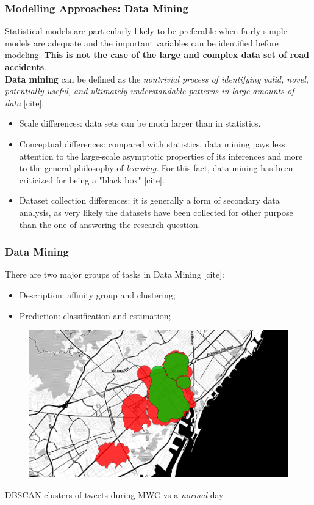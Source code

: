 \documentclass[hyperref={pdfpagelabels=true}]{beamer}
\begin{document}
\begin{frame}
\frametitle{Modelling Approaches: Data Mining}
Statistical models are particularly likely to be preferable when fairly simple models are adequate and the important variables can
be identified before modeling. \textbf{This is not the case of the large and complex data set of road accidents}.\\
\vspace{5mm}
\textbf{Data mining} can be defined as the \textit{nontrivial process of identifying valid, novel, potentially useful, and ultimately understandable patterns in large amounts of data} [cite].
\small{
\begin{itemize}
\item<1-> Scale differences: data sets can be much larger than in statistics.
\item<2-> Conceptual differences: compared with statistics, data mining pays less attention to the large-scale asymptotic properties of its inferences and more to the general philosophy of \textit{learning}. For this fact, data mining has been criticized for being a "black box" [cite].
\item<3-> Dataset collection differences: it is generally a form of secondary data analysis, as very likely the datasets have been collected for other purpose than the one of answering the research question.
\end{itemize}
}
\end{frame}

\begin{frame}
\frametitle{Data Mining}
There are two major groups of tasks in Data Mining [cite]:
\begin{itemize}
\item Description: affinity group and clustering;
\item Prediction: classification and estimation;
\end{itemize}
\begin{figure}
\includegraphics[scale=0.35]{mwc_nonmwc_1000_0125.png}
\end{figure}
\tiny{DBSCAN clusters of tweets during MWC vs a \textit{normal} day}
\end{frame}
\end{document}
